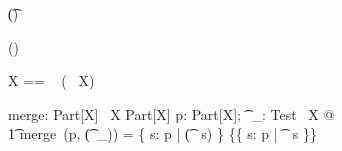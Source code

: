 \begin{zed}
   \relation (\t \varg)
\end{zed}

\begin{zed}
   \generic (\Test \varg)
\end{zed}

\begin{zed}
 \Test X == \power~  (\power~  X)
\end{zed}

\begin{gendef}[X]
  merge: Part[X] \cross  \Test~X \fun  Part[X]
\where
   \forall  p: Part[X]; \t~\_: Test~ X @ \\
 	\t1 merge~(p, (\t~\_)) = \{  s: p | \lnot  (\t~ s) \} \cup  \{\bigcup  \{  s: p | \t~ s \}\}
\end{gendef}